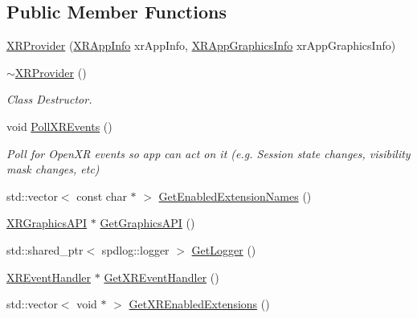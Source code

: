 \subsection*{Public Member Functions}
\begin{DoxyCompactItemize}
\item 
\mbox{\hyperlink{class_open_x_r_provider_1_1_x_r_provider_ae4e2c14022b9db81c0c4090151976bcf}{X\+R\+Provider}} (\mbox{\hyperlink{struct_open_x_r_provider_1_1_x_r_app_info}{X\+R\+App\+Info}} xr\+App\+Info, \mbox{\hyperlink{struct_open_x_r_provider_1_1_x_r_app_graphics_info}{X\+R\+App\+Graphics\+Info}} xr\+App\+Graphics\+Info)
\item 
\mbox{\hyperlink{class_open_x_r_provider_1_1_x_r_provider_a7bce537abed2b4a5ebb7c34f61ccaae8}{$\sim$\+X\+R\+Provider}} ()
\begin{DoxyCompactList}\small\item\em Class Destructor. \end{DoxyCompactList}\item 
void \mbox{\hyperlink{class_open_x_r_provider_1_1_x_r_provider_a1eb2fce148d5ab2d3399235c23131808}{Poll\+X\+R\+Events}} ()
\begin{DoxyCompactList}\small\item\em Poll for Open\+XR events so app can act on it (e.\+g. Session state changes, visibility mask changes, etc) \end{DoxyCompactList}\item 
std\+::vector$<$ const char $\ast$ $>$ \mbox{\hyperlink{class_open_x_r_provider_1_1_x_r_provider_abc01e4edb4e9c0bc1ec3beb01d6d4acc}{Get\+Enabled\+Extension\+Names}} ()
\item 
\mbox{\hyperlink{class_open_x_r_provider_1_1_x_r_graphics_a_p_i}{X\+R\+Graphics\+A\+PI}} $\ast$ \mbox{\hyperlink{class_open_x_r_provider_1_1_x_r_provider_a1bd00e46e92f0b45945c7d92f9bde0b3}{Get\+Graphics\+A\+PI}} ()
\item 
std\+::shared\+\_\+ptr$<$ spdlog\+::logger $>$ \mbox{\hyperlink{class_open_x_r_provider_1_1_x_r_provider_a23806791a9dbc50aa1aaf4e3fcf53cc4}{Get\+Logger}} ()
\item 
\mbox{\hyperlink{class_open_x_r_provider_1_1_x_r_event_handler}{X\+R\+Event\+Handler}} $\ast$ \mbox{\hyperlink{class_open_x_r_provider_1_1_x_r_provider_a6fc3eedaf1b8b942fdf2bee8a1d21550}{Get\+X\+R\+Event\+Handler}} ()
\item 
std\+::vector$<$ void $\ast$ $>$ \mbox{\hyperlink{class_open_x_r_provider_1_1_x_r_provider_a0a7f5774b7db559ca3f2df8b81696ec3}{Get\+X\+R\+Enabled\+Extensions}} ()

\end{DoxyCompactItemize}

